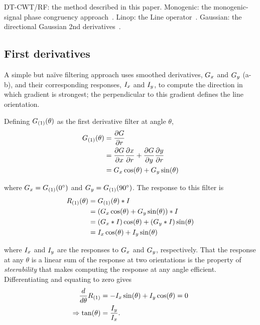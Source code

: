 DT-CWT/RF: the method described in this paper.
Monogenic: the monogenic-signal phase congruency approach~\cite{Wai_etal_MICCAI04}.
Linop: the Line operator~\cite{Dixon_Taylor_IPC79,Parr_etal_SPIE97}.
Gaussian: the directional Gaussian 2nd derivatives~\cite{Karssemeijer_teBrake_TMI96}.


\subsection{First derivatives}
A simple but na\"ive filtering approach uses smoothed derivatives, $G_x$ and $G_y$ (a-b), and their corresponding responses, $I_x$ and $I_y$, to compute the direction in which gradient is strongest; the perpendicular to this gradient defines the line orientation.

Defining $G_{(1)}(\theta)$ as the first derivative filter at angle $\theta$,
%
\begin{align}
G_{(1)}(\theta)
	&= 	\frac{\partial G}{\partial r} \\
	&= 	\frac{\partial G}{\partial x}\frac{\partial x}{\partial r} +
			\frac{\partial G}{\partial y}\frac{\partial y}{\partial r} \\
	&= 	G_x \cos(\theta) + G_y \sin(\theta)
\label{e:dG}
\end{align}

\noindent where $G_x = G_{(1)}(0^\circ)$ and $G_y = G_{(1)}(90^\circ)$. The response to this filter is
%
\begin{align}
R_{(1)}(\theta)
	&= 	G_{(1)}(\theta) \ast I \\
	&=	(G_x \cos(\theta) + G_y \sin(\theta)) \ast I \\
	&=	(G_x \ast I) \cos(\theta) + (G_y \ast I) \sin(\theta) \\
	&=	I_x \cos(\theta) + I_y \sin(\theta)
\label{e:R1}
\end{align}

\noindent where $I_x$ and $I_y$ are the responses to $G_x$ and $G_y$, respectively. That the response at any $\theta$ is a linear sum of the response at two orientations is the property of \emph{steerability} that makes computing the response at any angle efficient. Differentiating and equating to zero gives
%
\begin{align}
\frac{d}{d\theta}R_{(1)}
	&= -I_x \sin(\theta) + I_y \cos(\theta) = 0 \\
\Rightarrow \tan(\theta)
	&= \frac{I_y}{I_x}.
\label{e:t1}
\end{align}

